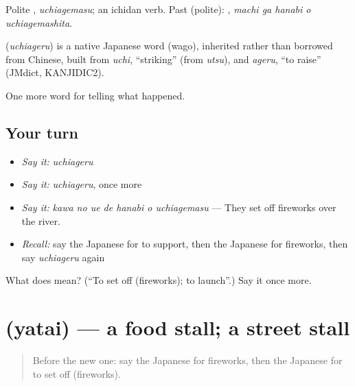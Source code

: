 Polite \textbf{}, \emph{uchiagemasu}; an ichidan verb. Past (polite): \textbf{  }, \emph{machi ga hanabi o uchiagemashita}.

\begin{cousinweb}
\textbf{} (\emph{uchiageru}) is a native Japanese word (wago), inherited rather than borrowed from Chinese, built from \emph{uchi}, \textquotedblleft{}striking\textquotedblright{} (from \emph{utsu}), and \emph{ageru}, \textquotedblleft{}to raise\textquotedblright{} (JMdict, KANJIDIC2).
\end{cousinweb}

\begin{grammarlens}[title={What you've built}]
One more word for telling what happened.
\end{grammarlens}

\subsection*{Your turn}
\begin{itemize}
\raggedright
  \item \emph{Say it:} \emph{uchiageru}
  \item \emph{Say it:} \emph{uchiageru}, once more
  \item \emph{Say it:} \emph{kawa no ue de hanabi o uchiagemasu} — They set off fireworks over the river.
  \item \emph{Recall:} say the Japanese for to support, then the Japanese for fireworks, then say \emph{uchiageru} again
\end{itemize}

\begin{tcolorbox}[breakable,colback=teal!4,colframe=teal!35!black,title={Before you move on}]
What does  mean? (\textquotedblleft{}To set off (fireworks); to launch\textquotedblright{}.) Say it once more.
\end{tcolorbox}
\section[\texorpdfstring{\ja{やたい} (yatai)}{やたい (yatai)}]{ (yatai) — a food stall; a street stall}

\label{lesson:JA-C293-yatai}



\begin{quote}
Before the new one: say the Japanese for fireworks, then the Japanese for to set off (fireworks).
\end{quote}

